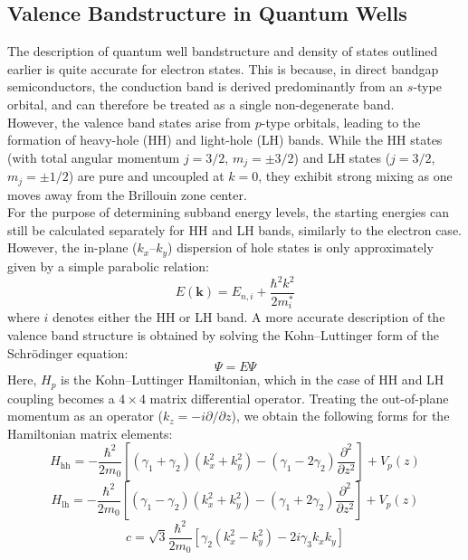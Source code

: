 \subsection{Valence Bandstructure in Quantum Wells}
The description of quantum well bandstructure and density of states outlined earlier is quite accurate for electron states. This is because, in direct bandgap semiconductors, the conduction band is derived predominantly from an $s$-type orbital, and can therefore be treated as a single non-degenerate band. \\
However, the valence band states arise from $p$-type orbitals, leading to the formation of heavy-hole (HH) and light-hole (LH) bands. While the HH states (with total angular momentum $j = 3/2$, $m_j = \pm 3/2$) and LH states ($j = 3/2$, $m_j = \pm 1/2$) are pure and uncoupled at $k = 0$, they exhibit strong mixing as one moves away from the Brillouin zone center.\\
For the purpose of determining subband energy levels, the starting energies can still be calculated separately for HH and LH bands, similarly to the electron case. However, the in-plane ($k_x$–$k_y$) dispersion of hole states is only approximately given by a simple parabolic relation:
\begin{equation}
	E(\mathbf{k}) = E_{n,i} + \frac{\hbar^2 k^2}{2 m_i^*}
\end{equation}
where $i$ denotes either the HH or LH band. A more accurate description of the valence band structure is obtained by solving the Kohn–Luttinger form of the Schrödinger equation:
\begin{equation}
	[H + V_p(z)] \Psi = E \Psi
\end{equation}
Here, $H_p$ is the Kohn–Luttinger Hamiltonian, which in the case of HH and LH coupling becomes a $4 \times 4$ matrix differential operator. Treating the out-of-plane momentum as an operator ($k_z = -i \partial / \partial z$), we obtain the following forms for the Hamiltonian matrix elements:
\begin{equation}
	H_{\text{hh}} = -\frac{\hbar^2}{2m_0} \left[ (\gamma_1 + \gamma_2)(k_x^2 + k_y^2) - (\gamma_1 - 2\gamma_2) \frac{\partial^2}{\partial z^2} \right] + V_p(z)
\end{equation}
\begin{equation}
	H_{\text{lh}} = -\frac{\hbar^2}{2m_0} \left[ (\gamma_1 - \gamma_2)(k_x^2 + k_y^2) - (\gamma_1 + 2\gamma_2) \frac{\partial^2}{\partial z^2} \right] + V_p(z)
\end{equation}
\begin{equation}
	c = \sqrt{3} \frac{\hbar^2}{2 m_0} \left[\gamma_2(k_x^2 - k_y^2)- 2 i \gamma_3 k_x k_y\right]
\end{equation}
